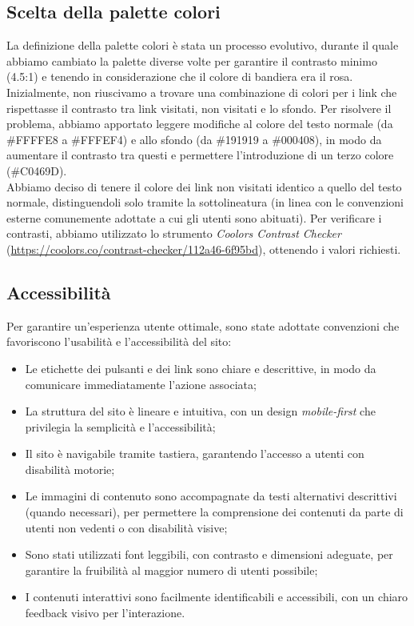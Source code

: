 \documentclass[10pt]{article}
\begin{document}
\subsection{Scelta della palette colori}
La definizione della palette colori è stata un processo evolutivo, durante il quale abbiamo cambiato la palette diverse volte per garantire il contrasto minimo (4.5:1) e tenendo in considerazione che il colore di bandiera era il rosa. Inizialmente, non riuscivamo a trovare una combinazione di colori per i link che rispettasse il contrasto tra link visitati, non visitati e lo sfondo. Per risolvere il problema, abbiamo apportato leggere modifiche al colore del testo normale (da \#FFFFE8 a \#FFFEF4) e allo sfondo (da \#191919 a \#000408), in modo da aumentare il contrasto tra questi e permettere l’introduzione di un terzo colore (\#C0469D).\\
Abbiamo deciso di tenere il colore dei link non visitati identico a quello del testo normale, distinguendoli solo tramite la sottolineatura (in linea con le convenzioni esterne comunemente adottate a cui gli utenti sono abituati). Per verificare i contrasti, abbiamo utilizzato lo strumento \textit{Coolors Contrast Checker} (\url{https://coolors.co/contrast-checker/112a46-6f95bd}), ottenendo i valori richiesti.

\subsection{Accessibilità}
Per garantire un'esperienza utente ottimale, sono state adottate convenzioni che favoriscono l'usabilità e l'accessibilità del sito:
\begin{itemize}
\item Le etichette dei pulsanti e dei link sono chiare e descrittive, in modo da comunicare immediatamente l’azione associata;
\item La struttura del sito è lineare e intuitiva, con un design \textit{mobile-first} che privilegia la semplicità e l'accessibilità;
\item Il sito è navigabile tramite tastiera, garantendo l'accesso a utenti con disabilità motorie;
\item Le immagini di contenuto sono accompagnate da testi alternativi descrittivi (quando necessari), per permettere la comprensione dei contenuti da parte di utenti non vedenti o con disabilità visive;
\item Sono stati utilizzati font leggibili, con contrasto e dimensioni adeguate, per garantire la fruibilità al maggior numero di utenti possibile;
\item I contenuti interattivi sono facilmente identificabili e accessibili, con un chiaro feedback visivo per l’interazione.
\end{itemize}
\end{document}
